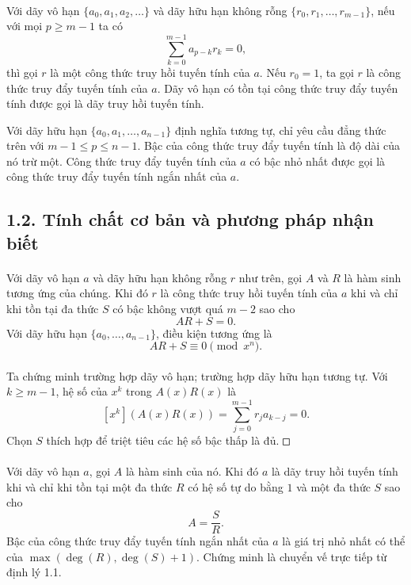 \documentclass[11pt]{article}
\newcommand{\square}{\mathord{\vcenter{\hrule height .5pt
  \hbox{\vrule width .5pt height 5pt\kern5pt\vrule width .5pt}
  \hrule height .5pt}}}
\begin{document}
\paragraph{}
Với dãy vô hạn \(\{a_0,a_1,a_2,\ldots\}\) và dãy hữu hạn không rỗng
\(\{r_0,r_1,\ldots,r_{m-1}\}\), nếu với mọi \(p\ge m-1\) ta có
\[
  \sum_{k=0}^{m-1}a_{p-k}r_k=0,
\]
thì gọi \(r\) là một công thức truy hồi tuyến tính của \(a\). Nếu \(r_0=1\),
ta gọi \(r\) là công thức truy đẩy tuyến tính của \(a\). Dãy vô hạn có tồn
tại công thức truy đẩy tuyến tính được gọi là dãy truy hồi tuyến tính.

Với dãy hữu hạn \(\{a_0,a_1,\ldots,a_{n-1}\}\) định nghĩa tương tự, chỉ yêu
cầu đẳng thức trên với \(m-1\le p\le n-1\). Bậc của công thức truy đẩy tuyến
tính là độ dài của nó trừ một. Công thức truy đẩy tuyến tính của \(a\) có bậc
nhỏ nhất được gọi là công thức truy đẩy tuyến tính ngắn nhất của \(a\).

\subsection*{1.2. Tính chất cơ bản và phương pháp nhận biết}

\paragraph{}
Với dãy vô hạn \(a\) và dãy hữu hạn không rỗng \(r\) như trên, gọi \(A\) và
\(R\) là hàm sinh tương ứng của chúng. Khi đó \(r\) là công thức truy hồi
tuyến tính của \(a\) khi và chỉ khi tồn tại đa thức \(S\) có bậc không vượt
quá \(m-2\) sao cho
\[
  AR+S=0.
\]
Với dãy hữu hạn \(\{a_0,\ldots,a_{n-1}\}\), điều kiện tương ứng là
\[
  AR+S\equiv0\pmod{x^n}.
\]

\paragraph{}
Ta chứng minh trường hợp dãy vô hạn; trường hợp dãy hữu hạn tương tự. Với
\(k\ge m-1\), hệ số của \(x^k\) trong \(A(x)R(x)\) là
\[
  [x^k](A(x)R(x))=\sum_{j=0}^{m-1}r_j a_{k-j}=0.
\]
Chọn \(S\) thích hợp để triệt tiêu các hệ số bậc thấp là đủ. \(\square\)

\paragraph{}
Với dãy vô hạn \(a\), gọi \(A\) là hàm sinh của nó. Khi đó \(a\) là dãy truy
hồi tuyến tính khi và chỉ khi tồn tại một đa thức \(R\) có hệ số tự do bằng
\(1\) và một đa thức \(S\) sao cho
\[
  A=\frac{S}{R}.
\]
Bậc của công thức truy đẩy tuyến tính ngắn nhất của \(a\) là giá trị nhỏ nhất
có thể của \(\max(\deg(R),\deg(S)+1)\). Chứng minh là chuyển vế trực tiếp từ
định lý 1.1.
\end{document}
